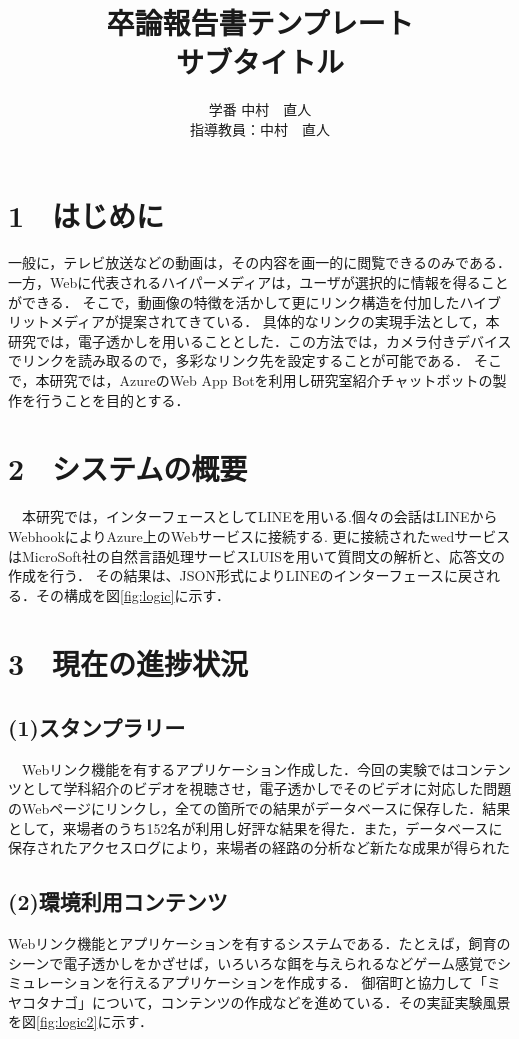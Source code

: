 \documentclass[twocolumn]{ltjsarticle}
\title{\vspace{-20mm}卒論報告書テンプレート\\サブタイトル\vspace{-5mm}}
\author{学番 中村　直人\\ \small{指導教員：中村　直人}}
\date{}
\begin{document}
\maketitle
\thispagestyle{titlepage}

\section*{1　はじめに}
 一般に，テレビ放送などの動画は，その内容を画一的に閲覧できるのみである．一方，Webに代表されるハイパーメディアは，ユーザが選択的に情報を得ることができる．
 そこで，動画像の特徴を活かして更にリンク構造を付加したハイブリットメディアが提案されてきている．
 具体的なリンクの実現手法として，本研究では，電子透かしを用いることとした．この方法では，カメラ付きデバイスでリンクを読み取るので，多彩なリンク先を設定することが可能である．
そこで，本研究では，AzureのWeb App Botを利用し研究室紹介チャットボットの製作を行うことを目的とする．
\section*{2　システムの概要}
　本研究では，インターフェースとしてLINEを用いる.個々の会話はLINEからWebhookによりAzure上のWebサービスに接続する. 
更に接続されたwedサービスはMicroSoft社の自然言語処理サービスLUISを用いて質問文の解析と、応答文の作成を行う．
その結果は、JSON形式によりLINEのインターフェースに戻される．その構成を図\ref{fig:logic}に示す．
\vspace{0mm}

\section*{3　現在の進捗状況}
\subsection*{(1)スタンプラリー}
　Webリンク機能を有するアプリケーション作成した．今回の実験ではコンテンツとして学科紹介のビデオを視聴させ，電子透かしでそのビデオに対応した問題のWebページにリンクし，全ての箇所での結果がデータベースに保存した．結果として，来場者のうち152名が利用し好評な結果を得た．また，データベースに保存されたアクセスログにより，来場者の経路の分析など新たな成果が得られた
\subsection*{(2)環境利用コンテンツ}
Webリンク機能とアプリケーションを有するシステムである．たとえば，飼育のシーンで電子透かしをかざせば，いろいろな餌を与えられるなどゲーム感覚でシミュレーションを行えるアプリケーションを作成する．
御宿町と協力して「ミヤコタナゴ」について，コンテンツの作成などを進めている．その実証実験風景を図\ref{fig:logic2}に示す．
\end{document}
